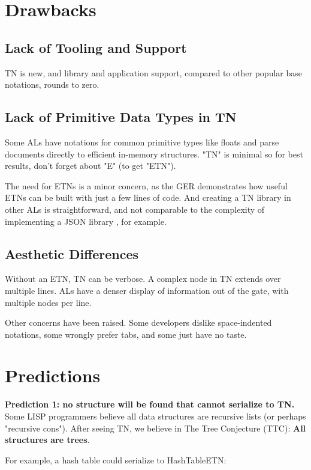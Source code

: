 \documentclass[journal]{IEEEtran}
\begin{document}
\section{Drawbacks}

\subsection{Lack of Tooling and Support}

TN is new, and library and application support, compared to other popular base notations, rounds to zero.

\subsection{Lack of Primitive Data Types in TN}

Some ALs have notations for common primitive types like floats and parse documents directly to efficient in-memory structures. "TN" is minimal so for best results, don't forget about "E" (to get "ETN").

The need for ETNs is a minor concern, as the GER demonstrates how useful ETNs can be built with just a few lines of code. And creating a TN library in other ALs is straightforward, and not comparable to the complexity of implementing a JSON library \cite{Ooms}, for example.

\subsection{Aesthetic Differences}

Without an ETN, TN can be verbose. A complex node in TN extends over multiple lines. ALs have a denser display of information out of the gate, with multiple nodes per line.

Other concerns have been raised. Some developers dislike space-indented notations, some wrongly prefer tabs, and some just have no taste.

\section{Predictions}

\textbf{Prediction 1: no structure will be found that cannot serialize to TN.} Some LISP programmers believe all data structures are recursive lists (or perhaps "recursive cons"). After seeing TN, we believe in The Tree Conjecture (TTC): \textbf{All structures are trees}.

For example, a hash table could serialize to HashTableETN:
\end{document}
